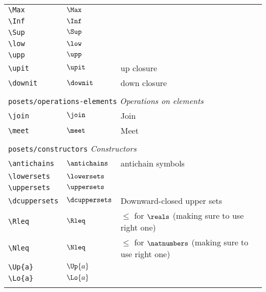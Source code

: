 \begin{longtable}{lll}
 {\color[rgb]{0.5,0.5,0.5}\texttt{\textbackslash Max}} & $\Max$ & \\ 
 {\color[rgb]{0.5,0.5,0.5}\texttt{\textbackslash Inf}} & $\Inf$ & \\ 
 {\color[rgb]{0.5,0.5,0.5}\texttt{\textbackslash Sup}} & $\Sup$ & \\ 
 {\color[rgb]{0.5,0.5,0.5}\texttt{\textbackslash low}} & $\low$ & \\ 
 {\color[rgb]{0.5,0.5,0.5}\texttt{\textbackslash upp}} & $\upp$ & \\ 
 {\color[rgb]{0.5,0.5,0.5}\texttt{\textbackslash upit}} & $\upit$ &  up closure\\ 
 {\color[rgb]{0.5,0.5,0.5}\texttt{\textbackslash downit}} & $\downit$ &  down closure\\ 
  &  & \\ 
 \multicolumn{3}{l}{{\color[rgb]{0.5,0.5,0.5}\texttt{posets/operations-elements}} \emph{Operations on elements}}\\ 
 \hline
{\color[rgb]{0.5,0.5,0.5}\texttt{\textbackslash join}} & $\join$ &  Join\\ 
 {\color[rgb]{0.5,0.5,0.5}\texttt{\textbackslash meet}} & $\meet$ &  Meet\\ 
  &  & \\ 
 \multicolumn{3}{l}{{\color[rgb]{0.5,0.5,0.5}\texttt{posets/constructors}} \emph{Constructors}}\\ 
 \hline
{\color[rgb]{0.5,0.5,0.5}\texttt{\textbackslash antichains}} & $\antichains$ &  antichain symbols\\ 
 {\color[rgb]{0.5,0.5,0.5}\texttt{\textbackslash lowersets}} & $\lowersets$ & \\ 
 {\color[rgb]{0.5,0.5,0.5}\texttt{\textbackslash uppersets}} & $\uppersets$ & \\ 
 {\color[rgb]{0.5,0.5,0.5}\texttt{\textbackslash dcuppersets}} & $\dcuppersets$ &  Downward-closed upper sets\\ 
 {\color[rgb]{0.5,0.5,0.5}\texttt{\textbackslash Rleq}} & $\Rleq$ &  $\leq$ for $\reals$ (making sure to use right one)\\ 
 {\color[rgb]{0.5,0.5,0.5}\texttt{\textbackslash Nleq}} & $\Nleq$ &  $\leq$ for $\natnumbers$ (making sure to use right one)\\ 
 {\color[rgb]{0.5,0.5,0.5}\texttt{\textbackslash Up\{a\}}} & $\Up{a}$ & \\ 
 {\color[rgb]{0.5,0.5,0.5}\texttt{\textbackslash Lo\{a\}}} & $\Lo{a}$ & \\ 
  &  & \\ 

\end{longtable}
